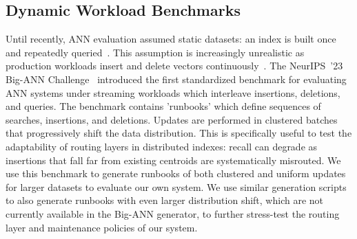 \documentclass[sigconf,review,anonymous]{acmart}
\begin{document}



\subsection{Dynamic Workload Benchmarks}

    Until recently, ANN evaluation assumed static datasets: an index is built once and repeatedly queried~\cite{simhadri2022results,simhadri2024results,jegou2011searching,yandex2016deep}. This assumption is increasingly unrealistic as production workloads insert and delete vectors continuously~\cite{singh2021freshdiskann, xu2023spfresh, mohoney2025quake}. The NeurIPS~'23 Big-ANN Challenge~\cite{simhadri2024results} introduced the first standardized benchmark for evaluating ANN systems under streaming workloads which interleave insertions, deletions, and queries. The benchmark contains 'runbooks' which define sequences of searches, insertions, and deletions. Updates are performed in clustered batches that progressively shift the data distribution. This is specifically useful to test the adaptability of routing layers in distributed indexes: recall can degrade as insertions that fall far from existing centroids are systematically misrouted. We use this benchmark to generate runbooks of both clustered and uniform updates for larger datasets to evaluate our own system. We use similar generation scripts to also generate runbooks with even larger distribution shift, which are not currently available in the Big-ANN generator, to further stress-test the routing layer and maintenance policies of our system.
    
\end{document}
